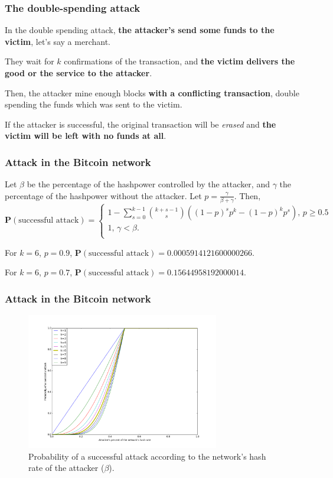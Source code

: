 \documentclass{beamer}
\begin{document}
\begin{frame}
\frametitle{The double-spending attack}

In the double spending attack, \textbf{the attacker's send some funds to the victim}, let's say a merchant.

They wait for $k$ confirmations of the transaction, and \textbf{the victim delivers the good or the service to the attacker}.

Then, the attacker mine enough blocks \textbf{with a conflicting transaction}, double spending the funds which was sent to the victim.

If the attacker is successful, the original transaction will be \textit{erased} and \textbf{the victim will be left with no funds at all}.

\end{frame}


\begin{frame}
\frametitle{Attack in the Bitcoin network}

\begin{theorem}
	Let $\beta$ be the percentage of the hashpower controlled by the attacker, and $\gamma$ the percentage of the hashpower without the attacker. Let $p = \frac{\gamma}{\beta + \gamma}$. Then,
$$
\mathbf{P}(\text{successful attack}) =
\begin{cases}
	1 - \sum_{s=0}^{k-1} \binom{k+s-1}{s} \left( (1-p)^s p^k - (1-p)^k p^s \right) \text{, $p \geq 0.5$} \\
	1 \text{, $\gamma < \beta$}.\\
\end{cases}
$$
\end{theorem}

For $k=6$, $p=0.9$, $\mathbf{P}(\text{successful attack}) = 0.0005914121600000266$.

For $k=6$, $p=0.7$, $\mathbf{P}(\text{successful attack}) = 0.15644958192000014$.

\end{frame}


\begin{frame}
\frametitle{Attack in the Bitcoin network}
\begin{figure}
\includegraphics[width=0.75\textwidth]{./images01/fig-bitcoin-attack.png}
\caption{Probability of a successful attack according to the network's hash rate of the attacker ($\beta$).}
\end{figure}
\end{frame}
\end{document}
